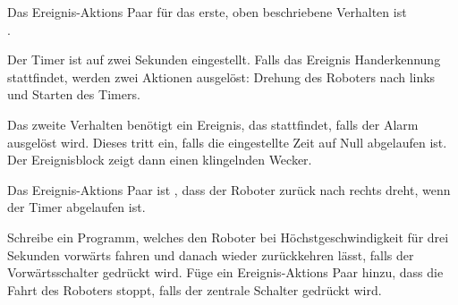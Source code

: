 Das Ereignis-Aktions Paar für das erste, oben beschriebene Verhalten ist \\ .

Der Timer ist auf zwei Sekunden eingestellt. Falls das Ereignis Handerkennung stattfindet, werden zwei Aktionen ausgelöst: Drehung des Roboters nach links und Starten des Timers.

Das zweite Verhalten benötigt ein Ereignis, das stattfindet, falls der Alarm ausgelöst wird. Dieses tritt ein, falls die eingestellte Zeit auf Null abgelaufen ist. Der Ereignisblock   zeigt dann einen klingelnden Wecker.

Das Ereignis-Aktions Paar ist , dass der Roboter zurück nach rechts dreht, wenn der Timer abgelaufen ist.



Schreibe ein Programm, welches den Roboter bei Höchstgeschwindigkeit für drei Sekunden vorwärts fahren und danach wieder zurückkehren lässt, falls der Vorwärtsschalter gedrückt wird. Füge ein Ereignis-Aktions Paar hinzu, dass die Fahrt des Roboters stoppt, falls der zentrale Schalter gedrückt wird.
